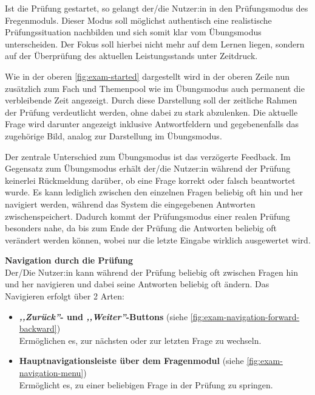 Ist die Prüfung gestartet, so gelangt der/die Nutzer:in in den Prüfungsmodus des Fregenmoduls. Dieser Modus soll möglichst
authentisch eine realistische Prüfungssituation nachbilden und sich somit klar vom Übungsmodus unterscheiden. Der Fokus soll 
hierbei nicht mehr auf dem Lernen liegen, sondern auf der Überprüfung des aktuellen Leistungsstands unter Zeitdruck. 

Wie in der oberen \autoref{fig:exam-started} dargestellt wird in der oberen Zeile nun zusätzlich zum Fach und Themenpool wie im 
Übungsmodus auch permanent die verbleibende Zeit angezeigt. Durch diese Darstellung soll der zeitliche Rahmen der Prüfung
verdeutlicht werden, ohne dabei zu stark abzulenken. Die aktuelle Frage wird darunter angezeigt inklusive Antwortfeldern und 
gegebenenfalls das zugehörige Bild, analog zur Darstellung im Übungsmodus.

Der zentrale Unterschied zum Übungsmodus ist das verzögerte Feedback. Im Gegensatz zum Übungsmodus erhält der/die Nutzer:in während
der Prüfung keinerlei Rückmeldung darüber, ob eine Frage korrekt oder falsch beantwortet wurde. Es kann lediglich zwischen den 
einzelnen Fragen beliebig oft hin und her navigiert werden, während das System die eingegebenen Antworten zwischenspeichert. Dadurch 
kommt der Prüfungsmodus einer realen Prüfung besonders nahe, da bis zum Ende der Prüfung die Antworten beliebig oft 
verändert werden können, wobei nur die letzte Eingabe wirklich ausgewertet wird.


\vspace{0.7cm}
\textbf{Navigation durch die Prüfung} \\
Der/Die Nutzer:in kann während der Prüfung beliebig oft zwischen Fragen hin und her navigieren und dabei seine Antworten beliebig
oft ändern. Das Navigieren erfolgt über 2 Arten:

\begin{itemize}
    \item \textbf{\textit{,,Zurück''}- und \textit{,,Weiter''}-Buttons} (siehe \autoref{fig:exam-navigation-forward-backward}) \\
    Ermöglichen es, zur nächsten oder zur letzten Frage zu wechseln.
    \item \textbf{Hauptnavigationsleiste über dem Fragenmodul} (siehe \autoref{fig:exam-navigation-menu}) \\
    Ermöglicht es, zu einer beliebigen Frage in der Prüfung zu springen.
\end{itemize}

